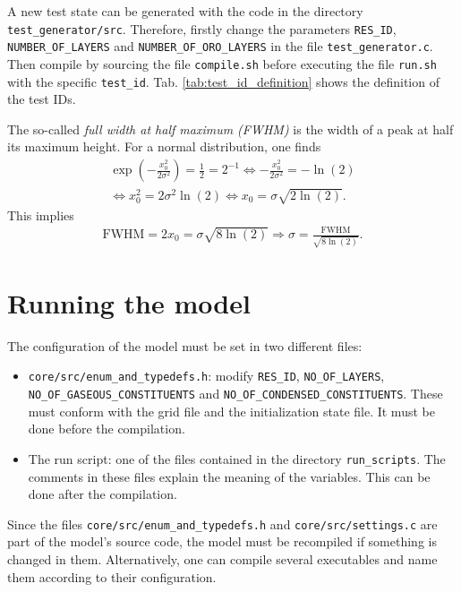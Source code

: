 \documentclass[10pt]{report}
\begin{document}
A new test state can be generated with the code in the directory \texttt{test\_generator/src}. Therefore, firstly change the parameters \texttt{RES\_ID}, \texttt{NUMBER\_OF\_LAYERS} and \texttt{NUMBER\_OF\_ORO\_LAYERS} in the file \texttt{test\_generator.c}. Then compile by sourcing the file \texttt{compile.sh} before executing the file \texttt{run.sh} with the specific \texttt{test\_id}. Tab. \ref{tab:test_id_definition} shows the definition of the test IDs.

The so-called \textit{full width at half maximum (FWHM)} is the width of a peak at half its maximum height. For a normal distribution, one finds
%
\begin{align}
\exp\left(-\frac{x_0^2}{2\sigma^2}\right) = \frac{1}{2} = 2^{-1}\Leftrightarrow -\frac{x_0^2}{2\sigma^2} = -\ln\left(2\right)\nonumber\\
\Leftrightarrow x_0^2 = 2\sigma^2\ln\left(2\right)\Leftrightarrow x_0 = \sigma\sqrt{2\ln\left(2\right)}.
\end{align}
%
This implies
%
\begin{align}
\text{FWHM} = 2x_0 = \sigma\sqrt{8\ln\left(2\right)} \Rightarrow \sigma = \frac{\text{FWHM}}{\sqrt{8\ln\left(2\right)}}.
\end{align}

\chapter{Running the model}
\label{chap:running_the_model}

The configuration of the model must be set in two different files:

\begin{itemize}
\item \texttt{core/src/enum\_and\_typedefs.h}: modify \texttt{RES\_ID}, \texttt{NO\_OF\_LAYERS}, \texttt{NO\_OF\_GASEOUS\_CONSTITUENTS} and \texttt{NO\_OF\_CONDENSED\_CONSTITUENTS}. These must conform with the grid file and the initialization state file. It must be done before the compilation.
\item The run script: one of the files contained in the directory \texttt{run\_scripts}. The comments in these files explain the meaning of the variables. This can be done after the compilation.
\end{itemize}
%
Since the files \texttt{core/src/enum\_and\_typedefs.h} and \texttt{core/src/settings.c} are part of the model's source code, the model must be recompiled if something is changed in them. Alternatively, one can compile several executables and name them according to their configuration.
\end{document}
